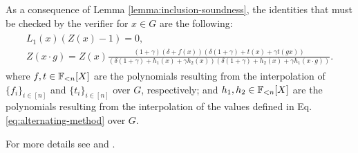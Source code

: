 As a consequence of Lemma \ref{lemma:inclusion-soundness}, the identities that must be checked by the verifier for $x \in G$ are the following: 
\begin{align} \label{eq:look-Z}
\begin{array}{c}
  L_1(x) \left( Z(x) - 1\right) = 0, \\[0.2cm]
  Z(x\cdot g) = \displaystyle Z(x)\frac{(1+\gamma)(\delta + f(x))(\delta(1+\gamma) + t(x) + \gamma t(gx))}{(\delta(1+\gamma) + {h_1}(x) + \gamma {h_2}(x))(\delta(1+\gamma) + {h_2}(x) + \gamma {h_1}(x\cdot g))}.
\end{array}
\end{align}
where $f,t \in \mathbb{F}_{<n}[X]$ are the polynomials resulting from the interpolation of $\{f_i\}_{i\in[n]}$ and $\{t_i\}_{i\in[n]}$ over $G$, respectively; and $h_1,h_2 \in \mathbb{F}_{<n}[X]$ are the polynomials resulting from the interpolation of the values defined in Eq. \eqref{eq:alternating-method} over $G$.

For more details see \cite{EPRINT:GabWil20} and \cite{EPRINT:PFMBM22}.
